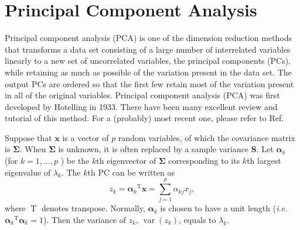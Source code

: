 \section{Principal Component Analysis\label{Sec:DR:PCA}}
Principal component analysis (PCA) is one of the dimension reduction methods that transforms a data set consisting of a large number of interrelated variables linearly to a new set of uncorrelated variables, the principal components (PCs), while retaining as much as possible of the variation present in the data set. The output PCs are ordered so that the first few retain most of the variation present in all of the original variables. Principal component analysis (PCA) was first developed by Hotelling in 1933.\cite{HotellingJEP1933} There have been many excellent review and tutorial of this method. For a (probably) most recent one, please refer to Ref.~\cite{GreenacreNRMP2022}


Suppose that $\mathbf{x}$ is a vector of $p$ random variables, of which the covariance matrix is $\boldsymbol{\Sigma}$. When $\boldsymbol{\Sigma}$ is unknown, it is often replaced by a sample variance $\mathbf{S}$. Let $\boldsymbol{\alpha}_k$ (for $k=1,\dots, p$ ) be the $k$th eigenvector of $\boldsymbol{\Sigma}$ corresponding to its $k$th largest eigenvalue of $\lambda_k$. The $k$th PC can be written as
\begin{equation}
	z_k={\boldsymbol{\alpha}_k}^{\operatorname{T}} \mathbf{x}=\sum_{j=1}^p \alpha_{kj}x_j,
\end{equation}
where $\operatorname{T}$ denotes transpose. Normally, $\boldsymbol{\alpha}_k$ is chosen to have a unit length (\textit{i.e.} ${\boldsymbol{\alpha}_k}^{\operatorname{T}}\boldsymbol{\alpha}_k=1$). Then the variance of $z_k$, $\operatorname{var}(z_k)$, equals to $\lambda_k$.

